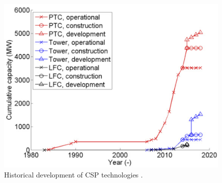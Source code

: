 \begin{figure}[!h] 
\centering
\includegraphics[width=0.65\linewidth]{FIG/CSP_technology_development}
\caption[Historical development of CSP technologies.]{Historical development of CSP technologies \cite{Abbas2015}.}\label{CSP_technology_development}
\end{figure}

